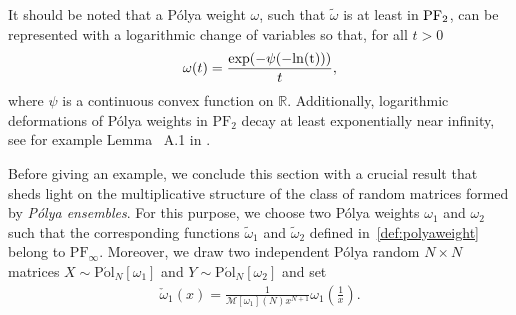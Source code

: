 \documentclass[pdflatex,sn-mathphys-num]{sn-jnl}
\theoremstyle{thmstyleone}
\numberwithin{equation}{section}
\newcommand{\R}{\mathbb{R}}
\begin{document}
It should be noted that a P\'olya weight $\omega$, such that $\widetilde{\omega}$ is at least in $\rm{PF}_{2}$, can be represented with a logarithmic change of variables so that, for all $t>0$
\begin{align}\label{id:polyarep}
    \omega(t)=\frac{\exp(-\psi(-\rm{ln}(t)))}{t},
\end{align}
where $\psi$ is a continuous convex function on $\R$. Additionally, logarithmic deformations of P\'olya weights in $\mathrm{PF}_{2}$ decay at least exponentially near infinity, see for example Lemma ~A.1 in \cite{DumbgenMaximumLikelihoodEstimation2009}.


Before giving an example, we conclude this section with a crucial result that sheds light on the multiplicative structure of the class of random matrices formed by \textit{P\'olya ensembles}. For this purpose, we choose two P\'olya weights $\omega_{1}$ and $\omega_{2}$ such that the corresponding functions $\widetilde{\omega}_{1}$ and $\widetilde{\omega}_{2}$ defined in~\eqref{def:polyaweight} belong to $\mathrm{PF}_{\infty}$. Moreover, we draw two independent P\'olya random $N\times N$ matrices $X\sim\mathrm{P\acute{o}l}_{N}\left [ \omega_{1} \right ]$ and $Y\sim\mathrm{P\acute{o}l}_{N}\left [ \omega_{2} \right ]$ and set
        \begin{align}
            \check{\omega}_{1}(x)=\frac{1}{\mathcal{M}[\omega_{1}](N)x^{N+1}}\omega_{1}\left ( \frac{1}{x} \right ).
        \end{align}     
        
\end{document}
